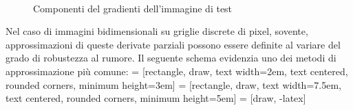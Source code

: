 \begin{figure}[!ht,scale=0.8]
\centering
{}
\\
\hspace{3mm}
\caption{Componenti del gradienti dell'immagine di test}
\label{fig:immagine_gradienti}
\end{figure}

Nel caso di immagini bidimensionali su griglie discrete di pixel, sovente, approssimazioni di queste derivate parziali possono essere definite al variare del grado di robustezza al rumore. Il seguente schema evidenzia uno dei metodi di approssimazione più comune:
 = [rectangle, draw, %
     text width=2em, text centered, rounded corners, minimum height=3em]
 = [rectangle, draw, %
     text width=7.5em, text centered, rounded corners, minimum height=5em]
 = [draw, -latex]
